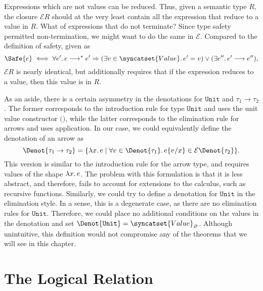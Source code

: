 Expressions which are not values can be reduced.
Thus, given a semantic type $R$, the closure $\mathcal{E} R$
should at the very least contain all the expression that reduce
to a value in $R$. What of expressions that do not terminate? Since
type safety permitted non-termination, we might want to do the same in
$\mathcal{E}$.
Compared to the definition of safety, given as
\[
  \Safe{e} \iff
  \forall e'\ldotp e \longrightarrow^* e'
    \Rightarrow (\exists v \in \syncatset{Value}\ldotp e'=v) \lor
      (\exists e'' \ldotp e'\longrightarrow e''),
\]
$\mathcal{E} R$ is nearly identical, but additionally requires that if the
expression reduces to a value, then this value is in $R$.

As an aside, there is a certain asymmetry in the denotations for
$\texttt{Unit}$ and $\tau_1\to\tau_2$. The former corresponds to the
introduction rule for type $\texttt{Unit}$ and uses the unit value constructor
$\texttt{()}$, while the latter corresponds to the elimination rule for
arrows and uses application.
In our case, we could equivalently define the denotation of an arrow as
\[
  \Denot{\tau_1 \to \tau_2} = \{ \lambda x\ldotp e \mid
  \forall v \in \Denot{\tau_1}\ldotp
    \Subst{e}{v}{x} \in \mathcal{E}\Denot{\tau_2} \}.
\]
This version is similar to the introduction rule for the arrow type, and
requires values of the shape $\lambda x\ldotp e$. The problem with this
formulation is that it is less abstract, and therefore, fails to account for
extensions to the calculus, such as recursive functions. Similarly, we could
try to define a denotation for $\texttt{Unit}$ in the elimination style.
In a sense, this is a degenerate case, as there are no elimination rules for
$\texttt{Unit}$. Therefore, we could place no additional conditions on the
values in the denotation and set
$\Denot{\texttt{Unit}} = \syncatset{Value}_{\varnothing}$. Although
unintuitive, this definition would not compromise any of the theorems
that we will see in this chapter.

\section{The Logical Relation}
\label{sec:log-rel}

